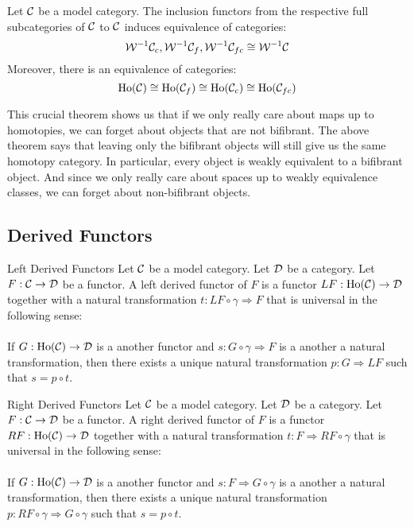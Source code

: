\documentclass[a4paper]{article}
\begin{document}
\begin{thm}{}{} Let $\mathcal{C}$ be a model category. The inclusion functors from the respective full subcategories of $\mathcal{C}$ to $\mathcal{C}$ induces equivalence of categories: $$\mathcal{W}^{-1}\mathcal{C}_c,\mathcal{W}^{-1}\mathcal{C}_f,\mathcal{W}^{-1}\mathcal{C}_{fc}\cong\mathcal{W}^{-1}\mathcal{C}$$ Moreover, there is an equivalence of categories: $$\text{Ho}(\mathcal{C})\cong\text{Ho}(\mathcal{C}_f)\cong\text{Ho}(\mathcal{C}_c)\cong\text{Ho}(\mathcal{C}_{fc})$$
\end{thm}

This crucial theorem shows us that if we only really care about maps up to homotopies, we can forget about objects that are not bifibrant. The above theorem says that leaving only the bifibrant objects will still give us the same homotopy category. In particular, every object is weakly equivalent to a bifibrant object. And since we only really care about spaces up to weakly equivalence classes, we can forget about non-bifibrant objects. 

\subsection{Derived Functors}
\begin{defn}{Left Derived Functors}{} Let $\mathcal{C}$ be a model category. Let $\mathcal{D}$ be a category. Let $F:\mathcal{C}\to\mathcal{D}$ be a functor. A left derived functor of $F$ is a functor $LF:\text{Ho}(\mathcal{C})\to\mathcal{D}$ together with a natural transformation $t:LF\circ\gamma\Rightarrow F$ that is universal in the following sense: \\~\\

If $G:\text{Ho}(\mathcal{C})\to\mathcal{D}$ is a another functor and $s:G\circ\gamma\Rightarrow F$ is a another a natural transformation, then there exists a unique natural transformation $p:G\Rightarrow LF$ such that $s=p\circ t$. 
\end{defn}

\begin{defn}{Right Derived Functors}{} Let $\mathcal{C}$ be a model category. Let $\mathcal{D}$ be a category. Let $F:\mathcal{C}\to\mathcal{D}$ be a functor. A right derived functor of $F$ is a functor $RF:\text{Ho}(\mathcal{C})\to\mathcal{D}$ together with a natural transformation $t:F\Rightarrow RF\circ\gamma$ that is universal in the following sense: \\~\\

If $G:\text{Ho}(\mathcal{C})\to\mathcal{D}$ is a another functor and $s:F\Rightarrow G\circ\gamma$ is a another a natural transformation, then there exists a unique natural transformation $p:RF\circ\gamma\Rightarrow G\circ\gamma$ such that $s=p\circ t$. 
\end{defn}
\end{document}
